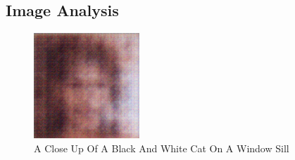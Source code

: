 \documentclass{article}%
\begin{document}
%
\subsection{Image Analysis}%
\label{subsec:ImageAnalysis}%


\begin{figure}[h!]%
\centering%
\includegraphics[width=150px]{500_fake_images/samples_5_145.png}%
\caption{A Close Up Of A Black And White Cat On A Window Sill}%
\end{figure}

%
\end{document}
